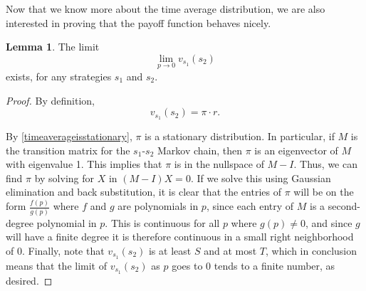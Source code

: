 \documentclass[12pt]{article}
\theoremstyle{definition}
\newtheorem{lemma}[theorem]{Lemma}
\theoremstyle{remark}
\begin{document}



Now that we know more about the time average distribution, we are also interested in proving that the payoff function behaves nicely.

\begin{lemma}
  \label{limitvexists}
  The limit \begin{equation*}
    \lim_{p \to 0} v_{s_1}(s_2)
  \end{equation*}
  exists, for any strategies $s_1$ and $s_2$.
\end{lemma}
\begin{proof}
  By definition, \begin{equation*}
    v_{s_1}(s_2) = \pi \cdot r.
  \end{equation*}

  By \cref{timeaverageisstationary}, $\pi$ is a stationary distribution. In particular, if $M$ is the transition matrix for the $s_1$-$s_2$ Markov chain, then $\pi$ is an eigenvector of $M$ with eigenvalue 1. This implies that $\pi$ is in the nullspace of $M - I$. Thus, we can find $\pi$ by solving for $X$ in $(M - I)X = 0$. If we solve this using Gaussian elimination and back substitution, it is clear that the entries of $\pi$ will be on the form $\frac{f(p)}{g(p)}$ where $f$ and $g$ are polynomials in $p$, since each 
  entry of $M$ is a second-degree polynomial in $p$. This is continuous for all $p$ where $g(p) \neq 0$, and since $g$ will have a finite degree it is therefore continuous in a small right neighborhood of 0. Finally, note that $v_{s_1}(s_2)$ is at least $S$ and at most $T$, which in conclusion means that the limit of $v_{s_1}(s_2)$ as $p$ goes to 0 tends to a finite number, as desired.
\end{proof}
\end{document}

